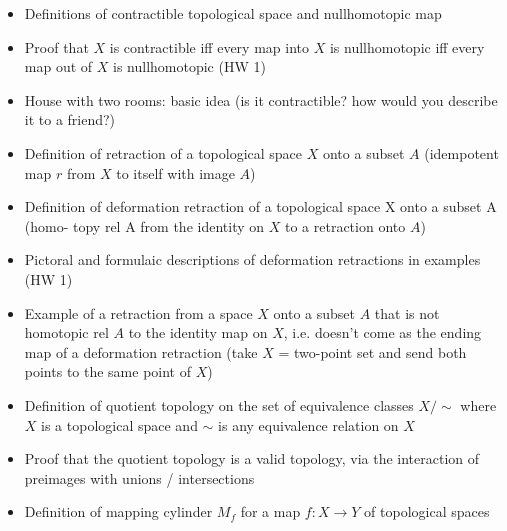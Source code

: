 \documentclass[12pt]{article}
\begin{document}
\begin{itemize}
\vspace*{30mm}
\item Definitions of contractible topological space and nullhomotopic map
    

\vspace*{30mm}
\item Proof that $X$ is contractible iff every map into $X$ is nullhomotopic iff every map out
    of $X$ is nullhomotopic (HW 1)
    

\vspace*{30mm}
\item House with two rooms: basic idea (is it contractible? how would you describe it to a
    friend?)
    

\vspace*{30mm}
\item Definition of retraction of a topological space $X$ onto a subset $A$ (idempotent map $r$
    from $X$ to itself with image $A$)
    

\vspace*{30mm}
\item Definition of deformation retraction of a topological space X onto a subset A (homo-
    topy rel A from the identity on $X$ to a retraction onto $A$)
    

\vspace*{30mm}
\item Pictoral and formulaic descriptions of deformation retractions in examples (HW 1)
    

\vspace*{30mm}
\item Example of a retraction from a space $X$ onto a subset $A$ that is not homotopic rel
    $A$ to the identity map on $X$, i.e. doesn't come as the ending map of a deformation
    retraction (take $X$ = two-point set and send both points to the same point of $X$)
    

\vspace*{30mm}
\item Definition of quotient topology on the set of equivalence classes $X/\sim$ where $X$ is a
    topological space and $\sim$ is any equivalence relation on $X$
    

\vspace*{30mm}
\item Proof that the quotient topology is a valid topology, via the interaction of preimages
    with unions / intersections
    

\vspace*{30mm}
\item Definition of mapping cylinder $M_f$ for a map $f : X\to Y$ of topological spaces
    


\end{itemize}
\end{document}
